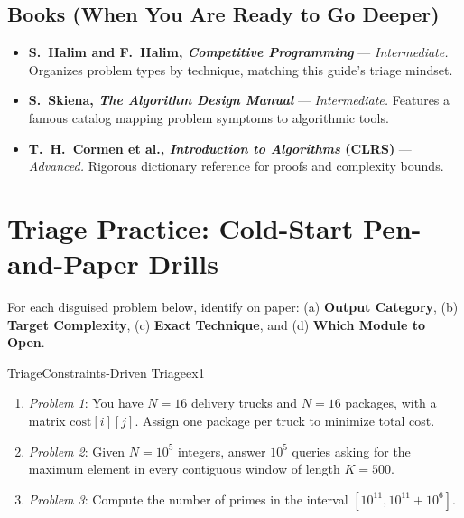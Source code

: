 \documentclass[11pt,a4paper]{article}
\begin{document}
\subsection*{Books (When You Are Ready to Go Deeper)}
\begin{itemize}
    \item \textbf{S.\ Halim and F.\ Halim, \emph{Competitive Programming}} --- \emph{Intermediate.} Organizes problem types by technique, matching this guide's triage mindset.
    \item \textbf{S.\ Skiena, \emph{The Algorithm Design Manual}} --- \emph{Intermediate.} Features a famous catalog mapping problem symptoms to algorithmic tools.
    \item \textbf{T.\ H.\ Cormen et al., \emph{Introduction to Algorithms} (CLRS)} --- \emph{Advanced.} Rigorous dictionary reference for proofs and complexity bounds.
\end{itemize}

\section*{Triage Practice: Cold-Start Pen-and-Paper Drills}

For each disguised problem below, identify on paper: (a) \textbf{Output Category}, (b) \textbf{Target Complexity}, (c) \textbf{Exact Technique}, and (d) \textbf{Which Module to Open}.

\begin{tryitbox}{Triage}{Constraints-Driven Triage}{ex1}
\begin{enumerate}[itemsep=2pt, topsep=2pt]
    \item \emph{Problem 1}: You have $N = 16$ delivery trucks and $N = 16$ packages, with a matrix $\text{cost}[i][j]$. Assign one package per truck to minimize total cost.
    \item \emph{Problem 2}: Given $N = 10^5$ integers, answer $10^5$ queries asking for the maximum element in every contiguous window of length $K = 500$.
    \item \emph{Problem 3}: Compute the number of primes in the interval $[10^{11}, 10^{11} + 10^6]$.
\end{enumerate}
\end{tryitbox}
\end{document}
